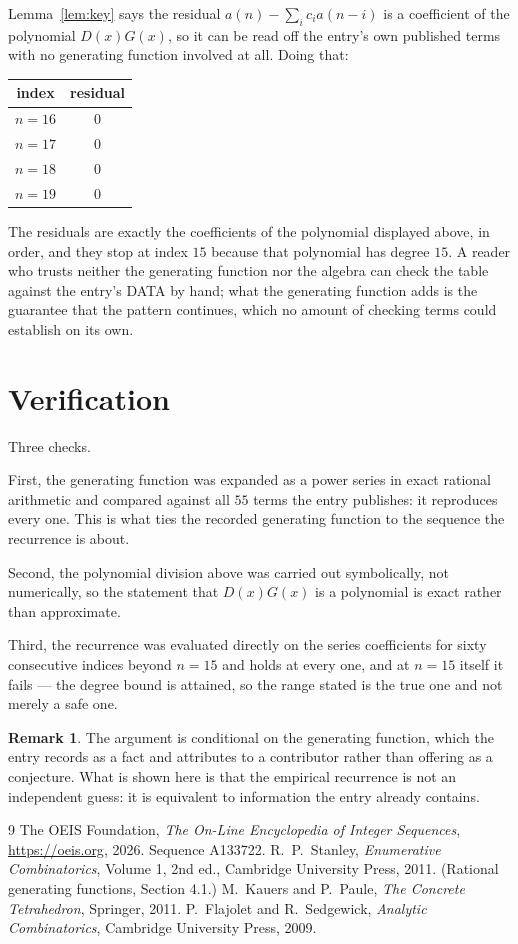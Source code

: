 \documentclass[11pt,a4paper]{article}
\theoremstyle{plain}
\theoremstyle{definition}
\newtheorem{remark}[theorem]{Remark}
\begin{document}
Lemma~\ref{lem:key} says the residual $a(n)-\sum_ic_ia(n-i)$ is a coefficient of the
polynomial $D(x)G(x)$, so it can be read off the entry's own published terms with no
generating function involved at all. Doing that:
\begin{center}
\begin{tabular}{cc}
index & residual \\ \hline
$n=16$ & $0$ \\
$n=17$ & $0$ \\
$n=18$ & $0$ \\
$n=19$ & $0$
\end{tabular}
\end{center}
The residuals are exactly the coefficients of the polynomial displayed above, in order, and
they stop at index $15$ because that polynomial has degree $15$. A reader who trusts
neither the generating function nor the algebra can check the table against the entry's DATA
by hand; what the generating function adds is the guarantee that the pattern continues, which
no amount of checking terms could establish on its own.

\section{Verification}

Three checks.

First, the generating function was expanded as a power series in exact rational arithmetic and
compared against all $55$ terms the entry publishes: it reproduces every one. This is
what ties the recorded generating function to the sequence the recurrence is about.

Second, the polynomial division above was carried out symbolically, not numerically, so the
statement that $D(x)G(x)$ is a polynomial is exact rather than approximate.

Third, the recurrence was evaluated directly on the series coefficients for sixty consecutive
indices beyond $n=15$ and holds at every one, and at $n=15$ itself it fails --- the
degree bound is attained, so the range stated is the true one and not merely a safe one.

\begin{remark}
The argument is conditional on the generating function, which the entry records as a fact and
attributes to a contributor rather than offering as a conjecture. What is shown here is that
the empirical recurrence is not an independent guess: it is equivalent to information the
entry already contains.
\end{remark}

\begin{thebibliography}{9}
 The OEIS Foundation, \emph{The On-Line Encyclopedia of Integer
Sequences}, \url{https://oeis.org}, 2026. Sequence A133722.
 R.~P.~Stanley, \emph{Enumerative Combinatorics}, Volume 1, 2nd ed.,
Cambridge University Press, 2011. (Rational generating functions, Section 4.1.)
 M.~Kauers and P.~Paule, \emph{The Concrete Tetrahedron}, Springer, 2011.
 P.~Flajolet and R.~Sedgewick, \emph{Analytic Combinatorics}, Cambridge
University Press, 2009.
\end{thebibliography}
\end{document}
